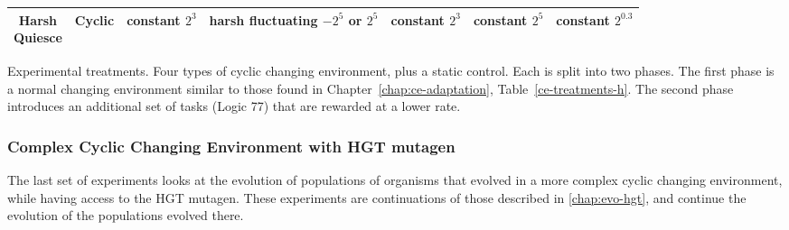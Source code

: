 \documentclass[PhD]{msu-thesis}
\begin{document}
\begin{table}[]
\begin{tabular}{|c|c||c|c||c|c|c|}
	\makecell{Harsh \\ Quiesce} & Cyclic & \makecell{constant \\ $2^3$} & \makecell{harsh \\ fluctuating \\ $-2^5$ or $2^5$} & \makecell{constant \\ $2^3$} & \makecell{constant \\ $2^5$} & \makecell{constant \\ $2^{0.3}$} \\\hline
	\end{tabular} 

	\begin{flushleft} Experimental treatments. Four types of cyclic changing environment, plus a static control. Each is split into two phases. The first phase is a normal changing environment similar to those found in Chapter~\ref{chap:ce-adaptation}, Table~\ref{ce-treatments-h}. The second phase introduces an additional set of tasks (Logic 77) that are rewarded at a lower rate.
	\end{flushleft}
	\label{cel-treatments}
	\end{table}


\subsubsection{Complex Cyclic Changing Environment with HGT mutagen}
The last set of experiments looks at the evolution of populations of organisms that evolved in a more complex cyclic changing environment, while having access to the HGT mutagen. These experiments are continuations of those described in \ref{chap:evo-hgt}, and continue the evolution of the populations evolved there.
\end{document}
